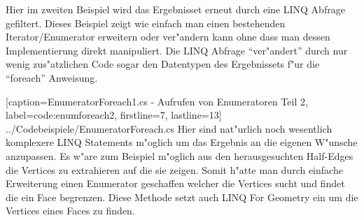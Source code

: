 \documentclass[pagesize, paper=a4, fontsize=12pt,titlepage=true, headings=small, headnosepline, abstractoff, liststotoc, nochapterprefix, plainheadsepline]{scrreprt}
\newcommand{\LFGS}{LINQ For Geometry }
\begin{document}
Hier im zweiten Beispiel wird das Ergebnisset erneut durch eine LINQ Abfrage gefiltert. Dieses Beispiel zeigt wie einfach man einen bestehenden Iterator/Enumerator erweitern oder ver"andern kann ohne dass man dessen Implementierung direkt manipuliert. Die LINQ Abfrage "`ver"andert"' durch nur wenig zus"atzlichen Code sogar den Datentypen des Ergebnissets f"ur die "`foreach"' Anweisung.

			[caption={EnumeratorForeach1.cs - Aufrufen von Enumeratoren Teil 2}, label=code:enumforeach2, firstline=7, lastline=13]
			{../Codebeispiele/EnumeratorForeach.cs}
Hier sind nat"urlich noch wesentlich komplexere LINQ Statements m"oglich um das Ergebnis an die eigenen W"unsche anzupassen. Es w"are zum Beispiel m"oglich aus den herausgesuchten Half-Edges die Vertices zu extrahieren auf die sie zeigen. Somit h"atte man durch einfache Erweiterung einen Enumerator geschaffen welcher die Vertices sucht und findet die ein Face begrenzen. Diese Methode setzt auch \LFGS ein um die Vertices eines Faces zu finden.
\newline
\end{document}
